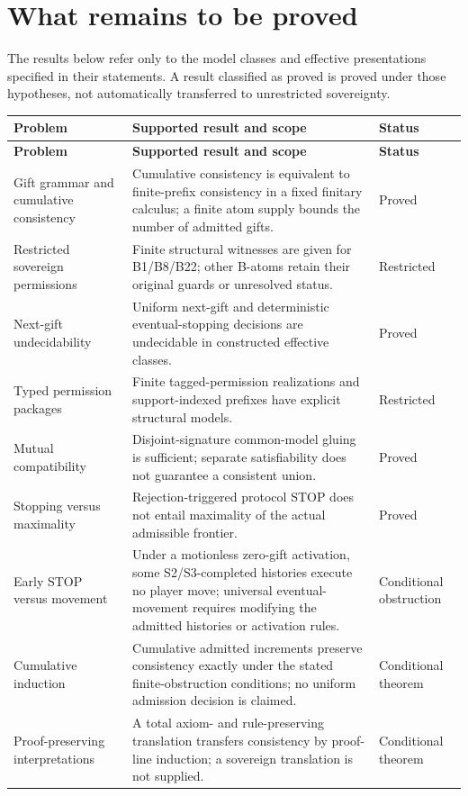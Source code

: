\documentclass[11pt,letterpaper]{article}
\theoremstyle{definition}\newtheorem{definition}[theorem]{Definition}\newtheorem{example}[theorem]{Example}
\theoremstyle{remark}\newtheorem{remark}[theorem]{Remark}
\begin{document}
\section{What remains to be proved}\label{sec:status-braid}
The results below refer only to the model classes and effective presentations
specified in their statements. A result classified as proved is proved under
those hypotheses, not automatically transferred to unrestricted sovereignty.
\begin{longtable}{@{}p{}p{}p{}@{}}
\toprule
\textbf{Problem} & \textbf{Supported result and scope} & \textbf{Status}\\\midrule\endfirsthead
\toprule
\textbf{Problem} & \textbf{Supported result and scope} & \textbf{Status}\\\midrule\endhead
Gift grammar and cumulative consistency & Cumulative consistency is equivalent to finite-prefix consistency in a fixed finitary calculus; a finite atom supply bounds the number of admitted gifts. & Proved \\
Restricted sovereign permissions & Finite structural witnesses are given for B1/B8/B22; other B-atoms retain their original guards or unresolved status. & Restricted \\
Next-gift undecidability & Uniform next-gift and deterministic eventual-stopping decisions are undecidable in constructed effective classes. & Proved \\
Typed permission packages & Finite tagged-permission realizations and support-indexed prefixes have explicit structural models. & Restricted \\
Mutual compatibility & Disjoint-signature common-model gluing is sufficient; separate satisfiability does not guarantee a consistent union. & Proved \\
Stopping versus maximality & Rejection-triggered protocol STOP does not entail maximality of the actual admissible frontier. & Proved \\
Early STOP versus movement & Under a motionless zero-gift activation, some S2/S3-completed histories execute no player move; universal eventual-movement requires modifying the admitted histories or activation rules. & Conditional obstruction \\
Cumulative induction & Cumulative admitted increments preserve consistency exactly under the stated finite-obstruction conditions; no uniform admission decision is claimed. & Conditional theorem \\
Proof-preserving interpretations & A total axiom- and rule-preserving translation transfers consistency by proof-line induction; a sovereign translation is not supplied. & Conditional theorem \\

\end{longtable}
\end{document}
